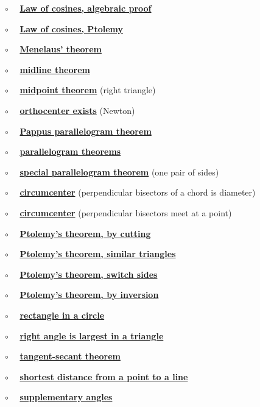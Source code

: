 \documentclass[11pt, oneside]{article}
\begin{document}
$\circ$ \ \ \hyperref[sec:law_of_cosines_algebraic]{\textbf{Law of cosines, algebraic proof}}

$\circ$ \ \ \hyperref[sec:LOC_by_Ptolemy]{\textbf{Law of cosines, Ptolemy}}

$\circ$ \ \ \hyperref[sec:Menelaus_theorem]{\textbf{Menelaus' theorem}}

$\circ$ \ \ \hyperref[sec:midline_theorem]{\textbf{midline theorem}} 

$\circ$ \ \ \hyperref[sec:right_triangle_midpoint_theorem]{\textbf{midpoint theorem}} (right triangle)

$\circ$ \ \ \hyperref[sec:Newton_altitude]{\textbf{orthocenter exists}}  (Newton)

$\circ$ \ \ \hyperref[sec:PProof_Pappus]{\textbf{Pappus parallelogram theorem}}

$\circ$ \ \ \hyperref[sec:diagonal_theorem]{\textbf{parallelogram theorems}}

$\circ$ \ \ \hyperref[sec:one_pair_of_sides]{\textbf{special parallelogram theorem}} (one pair of sides)

$\circ$ \ \ \hyperref[sec:perpendicular_bisector_of_a_chord]{\textbf{circumcenter}} (perpendicular bisectors of a chord is diameter)

$\circ$ \ \ \hyperref[sec:circumcenter]{\textbf{circumcenter}} (perpendicular bisectors meet at a point)

$\circ$ \ \ \hyperref[sec:Ptolemy_dissection]{\textbf{Ptolemy's theorem, by cutting}}

$\circ$ \ \ \hyperref[sec:Ptolemy_similar_triangles]{\textbf{Ptolemy's theorem, similar triangles}}

$\circ$ \ \ \hyperref[sec:Ptolemy_switch_sides]{\textbf{Ptolemy's theorem, switch sides}}

$\circ$ \ \ \hyperref[sec:Ptolemy_inversion]{\textbf{Ptolemy's theorem, by inversion}}

$\circ$ \ \ \hyperref[sec:rectangle_side_on_a_circle]{\textbf{rectangle in a circle}}

$\circ$ \ \ \hyperref[sec:right_angle_largest]{\textbf{right angle is largest in a triangle}}

$\circ$ \ \ \hyperref[sec:tangent_secant_theorem]{\textbf{tangent-secant theorem}}

$\circ$ \ \ \hyperref[sec:shortest_distance_to_line]{\textbf{shortest distance from a point to a line}}

$\circ$ \ \ \hyperref[sec:equal_supplementary_angles]{\textbf{supplementary angles}}
\end{document}
